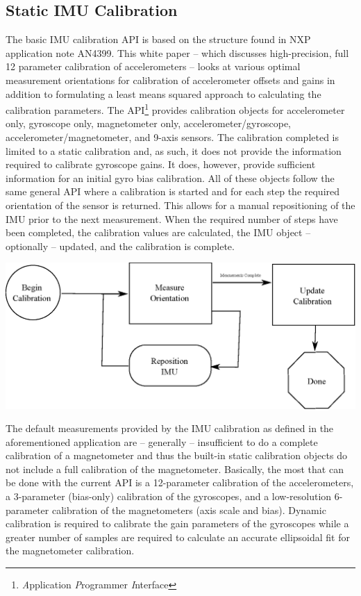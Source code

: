 \documentclass[10pt,letterpaper]{memoir} %
\begin{document}
\subsection{Static IMU Calibration}
The basic IMU calibration API is based on the structure found in NXP application note AN4399.  This white paper -- which discusses high-precision, full 12 parameter calibration of accelerometers -- looks at various optimal measurement orientations for calibration of accelerometer offsets and gains in addition to formulating a least means squared approach to calculating the calibration parameters.  The API\footnote{\emph{A}pplication \emph{P}rogrammer \emph{I}nterface} provides calibration objects for accelerometer only, gyroscope only, magnetometer only, accelerometer/gyroscope, accelerometer/magnetometer, and 9-axis sensors.  The calibration completed is limited to a static calibration and, as such, it does not provide the information required to calibrate gyroscope gains.  It does, however, provide sufficient information for an initial gyro bias calibration.  All of these objects follow the same general API where a calibration is started and for each step the required orientation of the sensor is returned.  This allows for a manual repositioning of the IMU prior to the next measurement.  When the required number of steps have been completed, the calibration values are calculated, the IMU object -- optionally -- updated, and the calibration is complete.

\includegraphics{imu_calibration_flow.eps}

The default measurements provided by the IMU calibration as defined in the aforementioned application are -- generally -- insufficient to do a complete calibration of a magnetometer and thus the built-in static calibration objects do not include a full calibration of the magnetometer.  Basically, the most that can be done with the current API is a 12-parameter calibration of the accelerometers, a 3-parameter (bias-only) calibration of the gyroscopes, and a low-resolution 6-parameter calibration of the magnetometers (axis scale and bias).  Dynamic calibration is required to calibrate the gain parameters of the gyroscopes while a greater number of samples are required to calculate an accurate ellipsoidal fit for the magnetometer calibration.
\end{document}
